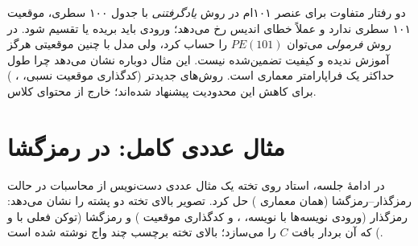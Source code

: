 \begin{addedbox}{دو رفتار متفاوت برای عنصر ۱۰۱ام}
در روش \emph{یادگرفتنی} با جدول ۱۰۰ سطری، موقعیت ۱۰۱ سطری ندارد و عملاً خطای اندیس رخ می‌دهد؛ ورودی باید بریده یا تقسیم شود. در روش \emph{فرمولی} می‌توان $PE(101)$ را حساب کرد، ولی مدل با چنین موقعیتی هرگز آموزش ندیده و کیفیت تضمین‌شده نیست. این مثال دوباره نشان می‌دهد چرا طول حداکثر یک فراپارامتر معماری است. روش‌های جدیدتر (کدگذاری موقعیت نسبی، ، ) برای کاهش این محدودیت پیشنهاد شده‌اند؛ خارج از محتوای کلاس.
\end{addedbox}

\section{مثال عددی کامل:  در رمزگشا}
\label{sec:ch10-example}
در ادامهٔ جلسه، استاد روی تخته یک مثال عددی دست‌نویس از محاسبات  در حالت رمزگذار--رمزگشا (همان معماری ) حل کرد. تصویر بالای تخته دو پشته را نشان می‌دهد: رمزگذار (ورودی نویسه‌ها با  نویسه، ، و کدگذاری موقعیت ) و رمزگشا (توکن فعلی با  و ) که  آن بردار بافت $C$ را می‌سازد؛ بالای تخته برچسب چند واج نوشته شده است.

